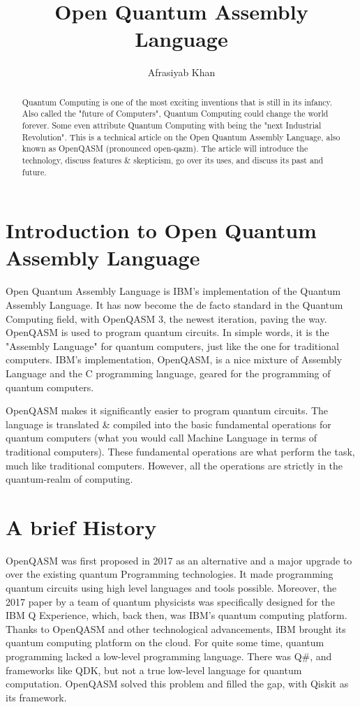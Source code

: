 \documentclass[conference]{IEEEtran}
\title{Open Quantum Assembly Language}
\author{Afrasiyab Khan}
\begin{document}

\newpage

\begin{abstract}
Quantum Computing is one of the most exciting inventions that is still in its infancy. Also called the "future of Computers", Quantum Computing could change the world forever. Some even attribute Quantum Computing with being the "next Industrial Revolution". This is a technical article on the Open Quantum Assembly Language, also known as OpenQASM (pronounced open-qazm). The article will introduce the technology, discuss features \& skepticism, go over its uses, and discuss its past and future. 
\end{abstract}

\section{\textbf{Introduction to Open Quantum Assembly Language}}
Open Quantum Assembly Language is IBM's implementation of the Quantum Assembly Language. It has now become the de facto standard in the Quantum Computing field, with OpenQASM 3, the newest iteration, paving the way. OpenQASM is used to program quantum circuits. In simple words, it is the "Assembly Language" for quantum computers, just like the one for traditional computers. IBM's implementation, OpenQASM, is a nice mixture of Assembly Language and the C programming language, geared for the programming of quantum computers. 

OpenQASM makes it significantly easier to program quantum circuits. The language is translated \& compiled into the basic fundamental operations for quantum computers (what you would call Machine Language in terms of traditional computers). These fundamental operations are what perform the task, much like traditional computers. However, all the operations are strictly in the quantum-realm of computing. \cite{b1}

\section*{\textbf{A brief History}}
OpenQASM was first proposed in 2017 as an alternative and a major upgrade to over the existing quantum Programming technologies. It made programming quantum circuits using high level languages and tools possible. Moreover, the 2017 paper by a team of quantum physicists was specifically designed for the IBM Q Experience, which, back then, was IBM's quantum computing platform. Thanks to OpenQASM and other technological advancements, IBM brought its quantum computing platform on the cloud. \cite{b2} 
For quite some time, quantum programming lacked a low-level programming language. There was Q#, and frameworks like QDK, but not a true low-level language for quantum computation. OpenQASM solved this problem and filled the gap, with Qiskit as its framework.
\end{document}
